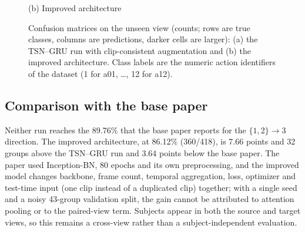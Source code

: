 \documentclass[runningheads]{llncs}
\begin{document}
\begin{figure}[tb]
\begin{minipage}{0.49\linewidth}

(b) Improved architecture
\end{minipage}
\caption{Confusion matrices on the unseen view (counts; rows are true classes, columns are predictions, darker cells are larger): (a) the TSN--GRU run with clip-consistent augmentation and (b) the improved architecture. Class labels are the numeric action identifiers of the dataset (1 for a01, \dots, 12 for a12).}
\label{fig:cm}
\end{figure}

\subsection{Comparison with the base paper}
Neither run reaches the 89.76\% that the base paper reports for the $\{1,2\}\to3$ direction. The improved architecture, at 86.12\% (360/418), is 7.66 points and 32 groups above the TSN--GRU run and 3.64 points below the base paper. The paper used Inception-BN, 80 epochs and its own preprocessing, and the improved model changes backbone, frame count, temporal aggregation, loss, optimizer and test-time input (one clip instead of a duplicated clip) together; with a single seed and a noisy 43-group validation split, the gain cannot be attributed to attention pooling or to the paired-view term. Subjects appear in both the source and target views, so this remains a cross-view rather than a subject-independent evaluation.
\end{document}

